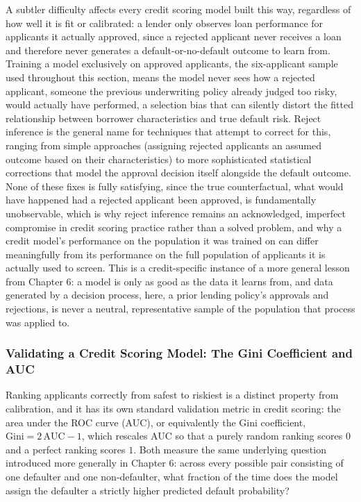 \documentclass[../ai_in_finance]{subfiles}
\begin{document}
A subtler difficulty affects every credit scoring model built this way, regardless of how well it is fit or calibrated: a lender only observes loan performance for applicants it actually approved, since a rejected applicant never receives a loan and therefore never generates a default-or-no-default outcome to learn from. Training a model exclusively on approved applicants, the six-applicant sample used throughout this section, means the model never sees how a rejected applicant, someone the previous underwriting policy already judged too risky, would actually have performed, a selection bias that can silently distort the fitted relationship between borrower characteristics and true default risk.
Reject inference is the general name for techniques that attempt to correct for this, ranging from simple approaches (assigning rejected applicants an assumed outcome based on their characteristics) to more sophisticated statistical corrections that model the approval decision itself alongside the default outcome. None of these fixes is fully satisfying, since the true counterfactual, what would have happened had a rejected applicant been approved, is fundamentally unobservable, which is why reject inference remains an acknowledged, imperfect compromise in credit scoring practice rather than a solved problem, and why a credit model's performance on the population it was trained on can differ meaningfully from its performance on the full population of applicants it is actually used to screen.
This is a credit-specific instance of a more general lesson from Chapter 6: a model is only as good as the data it learns from, and data generated by a decision process, here, a prior lending policy's approvals and rejections, is never a neutral, representative sample of the population that process was applied to.

\subsubsection*{Validating a Credit Scoring Model: The Gini Coefficient and AUC}
\label{sec:credit-model-validation}

Ranking applicants correctly from safest to riskiest is a distinct property from calibration, and it has its own standard validation metric in credit scoring: the area under the ROC curve (AUC), or equivalently the Gini coefficient, $\text{Gini} = 2\,\text{AUC}-1$, which rescales AUC so that a purely random ranking scores $0$ and a perfect ranking scores $1$. Both measure the same underlying question introduced more generally in Chapter 6: across every possible pair consisting of one defaulter and one non-defaulter, what fraction of the time does the model assign the defaulter a strictly higher predicted default probability?
\end{document}
